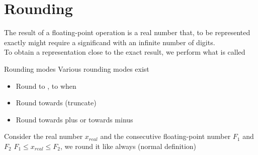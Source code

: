     \section{Rounding}
    The result of a floating-point operation is a real number that, to be represented exactly might require a significand with an infinite number of digits.\\
    To obtain a representation close to the exact result, we perform what is called 
    \begin{parag}{Rounding modes}
        Various rounding modes exist
        \begin{itemize}
            \item Round to , to  when 
            \item Round towards  (truncate)
            \item Round towards plus or towards minus 
        \end{itemize}
        Consider the real number $x_{real}$ and the consecutive floating-point number $F_1$ and $F_2$ $F_1 \leq x_{real} \leq F_2$, we round it like always (normal definition)
      
    \end{parag}
    
    
